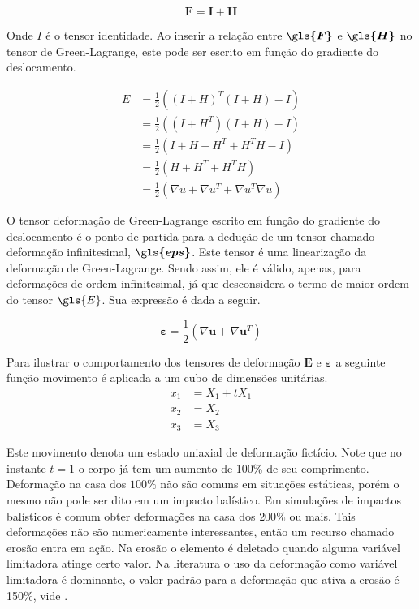 \begin{equation}
    \boldsymbol{F} = \boldsymbol{I + H}
\end{equation}

Onde $ I $ é o tensor identidade.
Ao inserir a relação entre $\boldsymbol{\gls{F}} $ e $ \boldsymbol{\gls{H}} $ no tensor de Green-Lagrange, este pode ser escrito em função do gradiente do deslocamento. 

 \boldmath\begin{align}
    E &= \frac{1}{2}((I + H)^T(I+H) - I)\\
    &=\frac{1}{2}((I + H^T)(I+H)-I) \\
    &= \frac{1}{2}(I + H + H^T + H^TH - I )\\
    &= \frac{1}{2}(H + H^T + H^TH) \\
    &= \frac{1}{2}(\nabla u + \nabla u^T + \nabla u^T\nabla u)
    \label{eq:green_lag_desl}
\end{align} \unboldmath

O tensor deformação de Green-Lagrange escrito em função do gradiente do deslocamento é o ponto de partida para a dedução de um tensor chamado deformação infinitesimal,  $ \boldsymbol{\gls{eps}} $. Este tensor é uma linearização da deformação de Green-Lagrange. Sendo assim, ele é válido, apenas, para deformações de ordem infinitesimal, já que desconsidera o termo de maior ordem do tensor $ \gls{E} $. Sua expressão é dada a seguir.

\begin{equation} \label{eq:definfi}
    \boldsymbol{\varepsilon} = \frac{1}{2}(\nabla \boldsymbol{u} + \nabla \boldsymbol{u}^T)
\end{equation}

Para ilustrar o comportamento dos tensores de deformação $\boldsymbol{E}$ e $\boldsymbol{\varepsilon}$ a seguinte função movimento é aplicada a um cubo de dimensões unitárias. 
\begin{align}
	x_1 &= X_1 + tX_1 \\
	x_2 &= X_2 \\
	x_3 &= X_3 
\end{align}

Este movimento denota um estado uniaxial de deformação fictício. Note que no instante $t=1$ o corpo já tem um aumento de 100\% de seu comprimento. Deformação na casa dos $100\%$ não são comuns em situações estáticas, porém o mesmo não pode ser dito em um impacto balístico. Em simulações de impactos balísticos é comum obter deformações na casa dos $ 200\% $ ou mais. Tais deformações não são numericamente interessantes, então um recurso chamado erosão entra em ação. Na erosão o elemento é deletado quando alguma variável limitadora atinge certo valor. Na literatura o uso da deformação como variável limitadora é dominante, o valor padrão para a deformação que ativa a erosão é 150\%, vide \cite{theorymanls}.  \par

